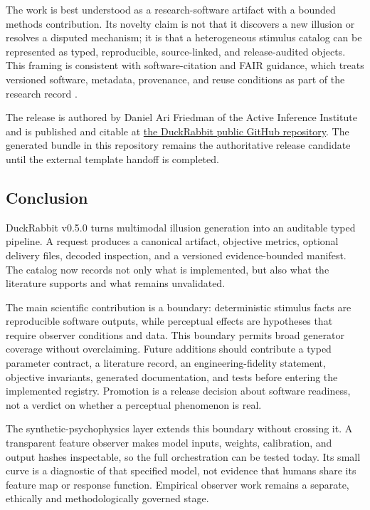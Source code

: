 \documentclass[
  english,
]{article}
\begin{document}
The work is best understood as a research-software artifact with a
bounded methods contribution. Its novelty claim is not that it discovers
a new illusion or resolves a disputed mechanism; it is that a
heterogeneous stimulus catalog can be represented as typed,
reproducible, source-linked, and release-audited objects. This framing
is consistent with software-citation and FAIR guidance, which treats
versioned software, metadata, provenance, and reuse conditions as part
of the research record
\citep{smith2016software, wilkinson2016fair, lamprecht2020fairsoftware}.

The release is authored by Daniel Ari Friedman of the Active Inference
Institute and is published and citable at
\href{https://github.com/docxology/DuckRabbit}{the DuckRabbit public
GitHub repository}. The generated bundle in this repository remains the
authoritative release candidate until the external template handoff is
completed.

\subsection{Conclusion}\label{sec:conclusion}

DuckRabbit v0.5.0 turns multimodal illusion generation into an auditable
typed pipeline. A request produces a canonical artifact, objective
metrics, optional delivery files, decoded inspection, and a versioned
evidence-bounded manifest. The catalog now records not only what is
implemented, but also what the literature supports and what remains
unvalidated.

The main scientific contribution is a boundary: deterministic stimulus
facts are reproducible software outputs, while perceptual effects are
hypotheses that require observer conditions and data. This boundary
permits broad generator coverage without overclaiming. Future additions
should contribute a typed parameter contract, a literature record, an
engineering-fidelity statement, objective invariants, generated
documentation, and tests before entering the implemented registry.
Promotion is a release decision about software readiness, not a verdict
on whether a perceptual phenomenon is real.

The synthetic-psychophysics layer extends this boundary without crossing
it. A transparent feature observer makes model inputs, weights,
calibration, and output hashes inspectable, so the full orchestration
can be tested today. Its small curve is a diagnostic of that specified
model, not evidence that humans share its feature map or response
function. Empirical observer work remains a separate, ethically and
methodologically governed stage.
\end{document}
